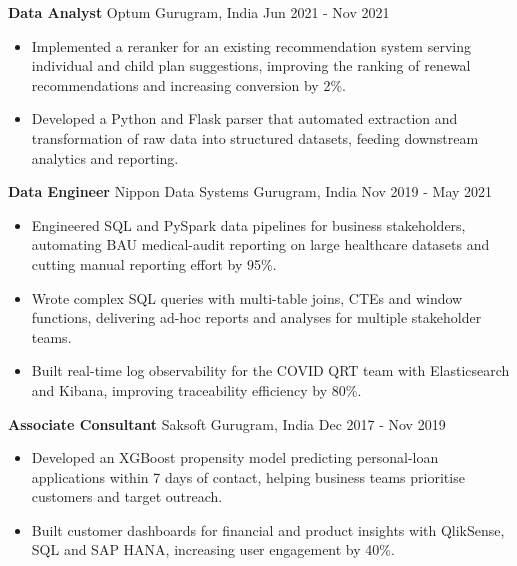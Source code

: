 \documentclass[10pt,a4paper]{article}
\newcommand{\role}[4]{\textbf{#1} \textbar{} #2 \hfill #3 \textbar{} #4\par}
\begin{document}
\vspace{3pt}
\role{Data Analyst}{Optum}{Gurugram, India}{Jun 2021 - Nov 2021}
\begin{itemize}
  \item Implemented a reranker for an existing recommendation system serving individual and child plan suggestions, improving the ranking of renewal recommendations and increasing conversion by 2\%.
  \item Developed a Python and Flask parser that automated extraction and transformation of raw data into structured datasets, feeding downstream analytics and reporting.
\end{itemize}
\vspace{3pt}
\role{Data Engineer}{Nippon Data Systems}{Gurugram, India}{Nov 2019 - May 2021}
\begin{itemize}
  \item Engineered SQL and PySpark data pipelines for business stakeholders, automating BAU medical-audit reporting on large healthcare datasets and cutting manual reporting effort by 95\%.
  \item Wrote complex SQL queries with multi-table joins, CTEs and window functions, delivering ad-hoc reports and analyses for multiple stakeholder teams.
  \item Built real-time log observability for the COVID QRT team with Elasticsearch and Kibana, improving traceability efficiency by 80\%.
\end{itemize}
\vspace{3pt}
\role{Associate Consultant}{Saksoft}{Gurugram, India}{Dec 2017 - Nov 2019}
\begin{itemize}
  \item Developed an XGBoost propensity model predicting personal-loan applications within 7 days of contact, helping business teams prioritise customers and target outreach.
  \item Built customer dashboards for financial and product insights with QlikSense, SQL and SAP HANA, increasing user engagement by 40\%.
\end{itemize}
\end{document}
